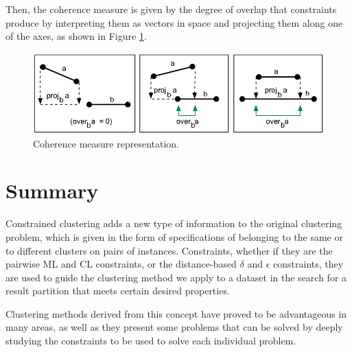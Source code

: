 Then, the coherence measure is given by the degree of overlap that constraints produce by interpreting them as vectors in space and projecting them along one of the axes, as shown in Figure \ref{fig:CoherenceOverlap}.

\begin{figure}[!h]
	\centering
	\includegraphics[scale=0.4]{gfx/ConstClust/Coherencia/Coher2}
	\caption[Coherence measure representation.]{Coherence measure representation. \cite{davidson2007survey}}\label{fig:CoherenceOverlap}
\end{figure}

\section{Summary}

Constrained clustering adds a new type of information to the original clustering problem, which is given in the form of specifications of belonging to the same or to different clusters on pairs of instances. Constraints, whether if they are the pairwise \acf{ML} and \acf{CL} constraints, or the distance-based $\delta$ and $\epsilon$ constraints, they are used to guide the clustering method we apply to a dataset in the search for a result partition that meets certain desired properties.

Clustering methods derived from this concept have proved to be advantageous in many areas, as well as they present some problems that can be solved by deeply studying the constraints to be used to solve each individual problem.


































